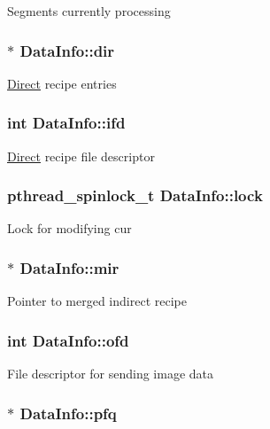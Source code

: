 \-Segments currently processing \hypertarget{structDataInfo_a9197ff2b89a692f1ed9faca47d5e6e41}{
\subsubsection[{dir}]{$\ast$ {\bf \-Data\-Info\-::dir}}}\label{structDataInfo_a9197ff2b89a692f1ed9faca47d5e6e41}
\hyperlink{structDirect}{\-Direct} recipe entries \hypertarget{structDataInfo_a80e6980a10d0cda89031447bccbc9fbe}{
\subsubsection[{ifd}]{\setlength{\rightskip}{0pt plus 5cm}int {\bf \-Data\-Info\-::ifd}}}\label{structDataInfo_a80e6980a10d0cda89031447bccbc9fbe}
\hyperlink{structDirect}{\-Direct} recipe file descriptor \hypertarget{structDataInfo_ab26e1a2ea30711ab136449d3c8341c59}{
\subsubsection[{lock}]{\setlength{\rightskip}{0pt plus 5cm}pthread\-\_\-spinlock\-\_\-t {\bf \-Data\-Info\-::lock}}}\label{structDataInfo_ab26e1a2ea30711ab136449d3c8341c59}
\-Lock for modifying cur \hypertarget{structDataInfo_a13fc7eb1fc2e6d166632515151a15edc}{
\subsubsection[{mir}]{$\ast$ {\bf \-Data\-Info\-::mir}}}\label{structDataInfo_a13fc7eb1fc2e6d166632515151a15edc}
\-Pointer to merged indirect recipe \hypertarget{structDataInfo_a7a0722c3de92180f73c4e06611132ed1}{
\subsubsection[{ofd}]{\setlength{\rightskip}{0pt plus 5cm}int {\bf \-Data\-Info\-::ofd}}}\label{structDataInfo_a7a0722c3de92180f73c4e06611132ed1}
\-File descriptor for sending image data \hypertarget{structDataInfo_ad99e6efd3299160bbc4e305d4af52264}{
\subsubsection[{pfq}]{$\ast$ {\bf \-Data\-Info\-::pfq}}}\label{structDataInfo_ad99e6efd3299160bbc4e305d4af52264}
